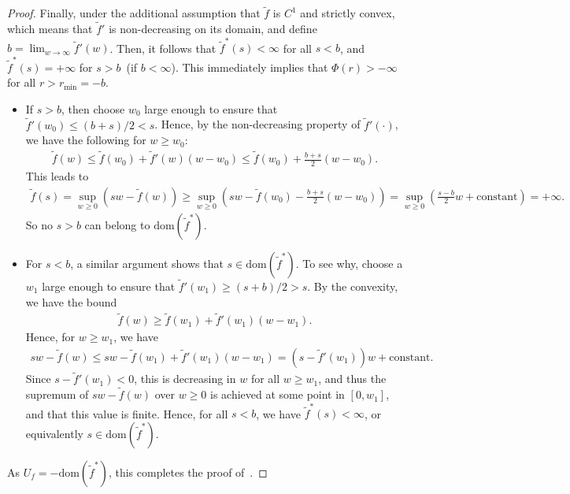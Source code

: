 \documentclass{article}
\theoremstyle{plain}
\theoremstyle{definition}
\newcommand{\lrp}[1]{\left( #1 \right)}
\newcommand{\ftilde}{\widetilde{f}}
\begin{document}
\begin{proof}
    Finally, under the additional assumption that $\ftilde$ is $C^1$ and strictly convex, which means that $\ftilde'$ is non-decreasing on its domain, and define $b = \lim_{w \to \infty} \ftilde'(w)$.  Then, it follows that $\ftilde^*(s) < \infty$ for all $s < b$, and $\ftilde^*(s) = + \infty$ for $s > b$~(if $b < \infty$). This immediately implies that $\Phi(r) > - \infty$ for all $r > r_{\min} = - b$. 
    \begin{itemize}
        \item If $s > b$, then choose $w_0$ large enough to ensure that $\ftilde'(w_0) \leq (b+s)/2 < s$. Hence, by the non-decreasing property of $\ftilde'(\cdot)$, we have the following for $w \geq w_0$: 
        \begin{align}
            \ftilde(w) \leq \ftilde(w_0) + \ftilde'(w)(w - w_0) \leq \ftilde(w_0) + \frac{b+s}{2} (w-w_0). 
        \end{align}
        This leads to
        \begin{align}
            \ftilde(s) = \sup_{w \geq 0} \lrp{s w - \ftilde(w)} \geq \sup_{w \geq 0} \lrp{ s w - \ftilde(w_0) - \frac{b+s}{2} (w-w_0)} =  \sup_{w \geq 0} \lrp{\frac{s-b}{2} w + \text{constant}} = + \infty. 
        \end{align}
        So no $s > b$ can belong to $\mathrm{dom}(\ftilde^*)$. 
        \item For $s < b$, a similar argument shows that $s \in \mathrm{dom}(\ftilde^*)$. To see why, choose a $w_1$ large enough to ensure that $\ftilde'(w_1) \geq (s+b)/2 > s$. By the convexity, we have the bound 
        \begin{align}
            \ftilde(w) \geq \ftilde(w_1) + \ftilde'(w_1)(w-w_1). 
        \end{align}
        Hence, for $w \geq w_1$, we have 
        \begin{align}
            sw - \ftilde(w) \leq s w - \ftilde(w_1) + \ftilde'(w_1)(w-w_1) = (s - \ftilde'(w_1)) w + \text{constant}. 
        \end{align}
        Since $s - \ftilde'(w_1) < 0$, this is decreasing in $w$ for all $w \geq w_1$, and thus the supremum of $sw - \ftilde(w)$ over $w \geq 0$ is achieved at some point in $[0, w_1]$, and that this value is finite. Hence, for all $s<b$, we have $\ftilde^*(s) < \infty$, or equivalently $s \in \mathrm{dom}(\ftilde^*)$. 
    \end{itemize}
    As $U_f = - \mathrm{dom}(\ftilde^*)$, this completes the proof of~. 
\end{proof}
\end{document}
